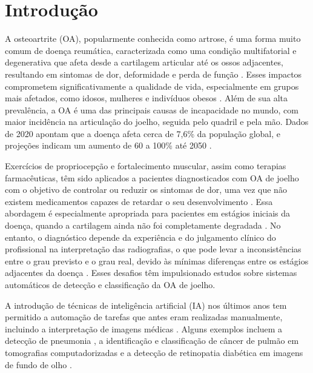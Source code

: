 
\chapter[Introdução]{Introdução}

A osteoartrite (OA), popularmente conhecida como artrose, é uma forma muito comum de doença reumática, caracterizada como uma condição multifatorial e degenerativa que afeta desde a cartilagem articular até os ossos adjacentes, resultando em sintomas de dor, deformidade e perda de função \cite{Kraus2015, PACCA2018}. Esses impactos comprometem significativamente a qualidade de vida, especialmente em grupos mais afetados, como idosos, mulheres e indivíduos obesos \cite{PACCA2018}. Além de sua alta prevalência, a OA é uma das principais causas de incapacidade no mundo, com maior incidência na articulação do joelho, seguida pelo quadril e pela mão. Dados de 2020 apontam que a doença afeta cerca de 7,6\% da população global, e projeções indicam um aumento de 60 a 100\% até 2050 \cite{COURTIES20241397}.

Exercícios de propriocepção e fortalecimento muscular, assim como terapias farmacêuticas, têm sido aplicados a pacientes diagnosticados com OA de joelho com o objetivo de controlar ou reduzir os sintomas de dor, uma vez que não existem medicamentos capazes de retardar o seu desenvolvimento \cite{Sardim2020, Lin2009}. Essa abordagem é especialmente apropriada para pacientes em estágios iniciais da doença, quando a cartilagem ainda não foi completamente degradada \cite{Kanamoto2020}. No entanto, o diagnóstico depende da experiência e do julgamento clínico do profissional na interpretação das radiografias, o que pode levar a inconsistências entre o grau previsto e o grau real, devido às mínimas diferenças entre os estágios adjacentes da doença \cite{KELLGREN1957, Mohammed2023}. Esses desafios têm impulsionado estudos sobre sistemas automáticos de detecção e classificação da OA de joelho.

A introdução de técnicas de inteligência artificial (IA) nos últimos anos tem permitido a automação de tarefas que antes eram realizadas manualmente, incluindo a interpretação de imagens médicas \cite{WANG2024103201}. Alguns exemplos incluem a detecção de pneumonia , a identificação e classificação de câncer de pulmão em tomografias computadorizadas e a detecção de retinopatia diabética em imagens de fundo de olho \cite{8697352, Dai2021}.

